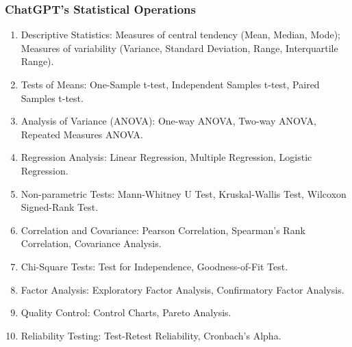 \documentclass{article}
\begin{document}
\subsubsection{ChatGPT's Statistical Operations}
\begin{enumerate}
    \item Descriptive Statistics: Measures of central tendency (Mean, Median, Mode); Measures of variability (Variance, Standard Deviation, Range, Interquartile Range).
    \item Tests of Means: One-Sample t-test, Independent Samples t-test, Paired Samples t-test.
    \item Analysis of Variance (ANOVA): One-way ANOVA, Two-way ANOVA, Repeated Measures ANOVA.
    \item Regression Analysis: Linear Regression, Multiple Regression, Logistic Regression.
    \item Non-parametric Tests: Mann-Whitney U Test, Kruskal-Wallis Test, Wilcoxon Signed-Rank Test.
    \item Correlation and Covariance: Pearson Correlation, Spearman's Rank Correlation, Covariance Analysis.
    \item Chi-Square Tests: Test for Independence, Goodness-of-Fit Test.
    \item Factor Analysis: Exploratory Factor Analysis, Confirmatory Factor Analysis.
    \item Quality Control: Control Charts, Pareto Analysis.
    \item Reliability Testing: Test-Retest Reliability, Cronbach's Alpha.
\end{enumerate}
\end{document}
